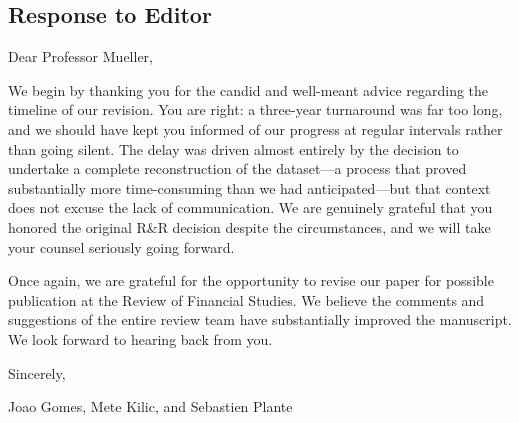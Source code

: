 \documentclass[hidelinks,11pt]{article}
\begin{document}
    \vspace*{-1.0cm}

    \begin{center}
        \section*{Response to Editor}
    \end{center}

    \noindent Dear Professor Mueller,

    We begin by thanking you for the candid and well-meant advice regarding the timeline of our revision. You are right: a three-year turnaround was far too long, and we should have kept you informed of our progress at regular intervals rather than going silent. The delay was driven almost entirely by the decision to undertake a complete reconstruction of the dataset---a process that proved substantially more time-consuming than we had anticipated---but that context does not excuse the lack of communication. We are genuinely grateful that you honored the original R\&R decision despite the circumstances, and we will take your counsel seriously going forward.

    

    \bigskip

    Once again, we are grateful for the opportunity to revise our paper for possible publication at the Review of Financial Studies. We believe the comments and suggestions of the entire review team have substantially improved the manuscript. We look forward to hearing back from you. 

    Sincerely, 

    Joao Gomes, Mete Kilic, and Sebastien Plante

    \clearpage
    
\end{document}
